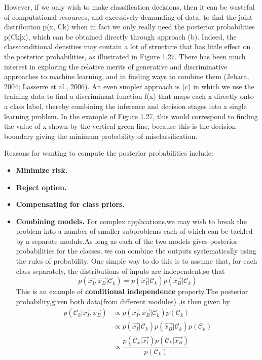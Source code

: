 However, if we only wish to make classification decisions, then it can be wasteful
of computational resources, and excessively demanding of data, to find the joint
distribution p(x, Ck) when in fact we only really need the posterior probabilities
p(Ck|x), which can be obtained directly through approach (b). Indeed, the classconditional
densities may contain a lot of structure that has little effect on the posterior
probabilities, as illustrated in Figure 1.27. There has been much interest in
exploring the relative merits of generative and discriminative approaches to machine
learning, and in finding ways to combine them (Jebara, 2004; Lasserre et al., 2006).
An even simpler approach is (c) in which we use the training data to find a
discriminant function f(x) that maps each x directly onto a class label, thereby
combining the inference and decision stages into a single learning problem. In the
example of Figure 1.27, this would correspond to finding the value of x shown by
the vertical green line, because this is the decision boundary giving the minimum
probability of misclassification.

Reasons for wanting to compute the posterior probabilities include:
\begin{itemize}
	\item \textbf{Minimize risk.}
	\item \textbf{Reject option.}
	\item \textbf{Compensating for class priors.}
	\item \textbf{Combining models.} For complex applications,we may wish to break the problem into a number of smaller subproblems each of which can be tackled by a separate module.As long as each of 	the two models gives posterior probabilities for the classes, we can combine 	the outputs systematically using the rules of probability. One simple way to 	do this is to assume that, for each class separately, the distributions of inputs are independent,so that
	\begin{equation}
	p(\vec{x_I},\vec{x_B}|\mathcal{C}_k)  = p(\vec{x_I}|\mathcal{C}_k)p(\vec{x_B}|\mathcal{C}_k)
	\end{equation}
	This is an example of \textbf{conditional independence} property.The posterior probability,given both data(from different modules) ,is then given by 
	\begin{align}
	p(\mathcal{C}_k|\vec{x_I},\vec{x_B}) &\propto p(\vec{x_I},\vec{x_B}|\mathcal{C}_k)p(\mathcal{C}_k) \\
	&\propto p(\vec{x_I}|\mathcal{C}_k)p(\vec{x_B}|\mathcal{C}_k)p(\mathcal{C}_k) \\
	&\propto \dfrac{p(\mathcal{C}_k|\vec{x_I})p(\mathcal{C}_k|\vec{x_B})}{p(\mathcal{C}_k)}
	\end{align}
\end{itemize}

